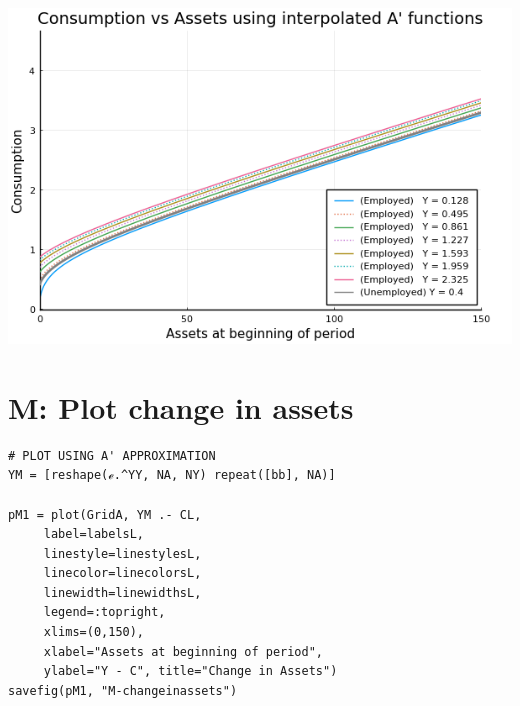 \documentclass[12pt]{article}
\begin{document}
\includegraphics[]{problem sets/ps9/L-consumption.png}









\newpage
\section*{M: Plot change in assets}



\begin{lstlisting}[language=JuliaLocal, style=julia]
# PLOT USING A' APPROXIMATION
YM = [reshape(ℯ.^YY, NA, NY) repeat([bb], NA)]

pM1 = plot(GridA, YM .- CL,
     label=labelsL,
     linestyle=linestylesL,
     linecolor=linecolorsL,
     linewidth=linewidthsL,
     legend=:topright,
     xlims=(0,150),
     xlabel="Assets at beginning of period",
     ylabel="Y - C", title="Change in Assets")
savefig(pM1, "M-changeinassets")

\end{lstlisting}
\end{document}
